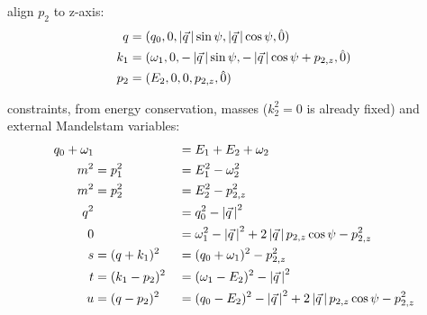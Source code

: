 align $p_2$ to z-axis:
\begin{align}
q &= (q_0,0,\left|\vec q\,\right|\sin\psi,\left|\vec q\,\right|\cos\psi,\hat 0)\\
k_1 &= (\omega_1,0,-\left|\vec q\,\right|\sin\psi,-\left|\vec q\,\right|\cos\psi+p_{2,z}, \hat 0)\\
p_2 &= (E_2,0,0,p_{2,z}, \hat 0)
\end{align}

constraints, from energy conservation, masses ($k_2^2 = 0$ is already fixed) and external Mandelstam variables:
\begin{align}
q_0+\omega_1 & &&=E_1+E_2+\omega_2 \label{eq:PSConIIIMomCon}\\
m^2 &= p_1^2 &&= E_1^2 - \omega_2^2 \label{eq:PSConIIIp1}\\
m^2 &= p_2^2 &&= E_2^2 - p_{2,z}^2 \label{eq:PSConIIIp2} \\
q^2 & &&= q_0^2 - \left|\vec q\,\right|^2 \label{eq:PSConIIIq}\\
0 & &&= \omega_1^2 - \left|\vec q\,\right|^2 + 2\left|\vec q\,\right|p_{2,z}\cos\psi-p_{2,z}^2 \label{eq:PSConIIIk1}\\
s &= (q+k_1)^2 &&= (q_0+\omega_1)^2 - p_{2,z}^2 \label{eq:PSConIIIs}\\
t &= (k_1-p_2)^2 &&= (\omega_1-E_2)^2- \left|\vec q\,\right|^2 \label{eq:PSConIIIt}\\
u &= (q-p_2)^2 &&= (q_0-E_2)^2 - \left|\vec q\,\right|^2 + 2\left|\vec q\,\right|p_{2,z}\cos\psi-p_{2,z}^2 \label{eq:PSConIIIu}
\end{align}

